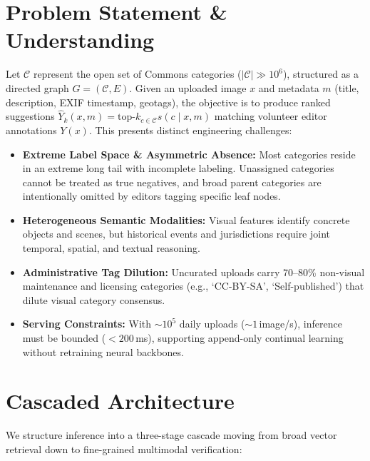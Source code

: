 \documentclass[10pt,a4paper,twocolumn]{article}
\begin{document}
\section{Problem Statement \& Understanding}
Let $\mathcal{C}$ represent the open set of Commons categories ($|\mathcal{C}| \gg 10^6$), structured as a directed graph $G=(\mathcal{C},E)$. Given an uploaded image $x$ and metadata $m$ (title, description, EXIF timestamp, geotags), the objective is to produce ranked suggestions $\hat{Y}_{k}(x,m) = \text{top-}k_{c \in \mathcal{C}} s(c \mid x,m)$ matching volunteer editor annotations $Y(x)$. This presents distinct engineering challenges:
\begin{itemize}[noitemsep,topsep=1pt,leftmargin=*]
  \item \textbf{Extreme Label Space \& Asymmetric Absence:} Most categories reside in an extreme long tail with incomplete labeling. Unassigned categories cannot be treated as true negatives, and broad parent categories are intentionally omitted by editors tagging specific leaf nodes.
  \item \textbf{Heterogeneous Semantic Modalities:} Visual features identify concrete objects and scenes, but historical events and jurisdictions require joint temporal, spatial, and textual reasoning.
  \item \textbf{Administrative Tag Dilution:} Uncurated uploads carry 70--80\% non-visual maintenance and licensing categories (e.g., `CC-BY-SA', `Self-published') that dilute visual category consensus.
  \item \textbf{Serving Constraints:} With $\sim 10^5$ daily uploads ($\sim 1$\,image/s), inference must be bounded ($<200$\,ms), supporting append-only continual learning without retraining neural backbones.
\end{itemize}

\section{Cascaded Architecture}
We structure inference into a three-stage cascade moving from broad vector retrieval down to fine-grained multimodal verification:
\end{document}
